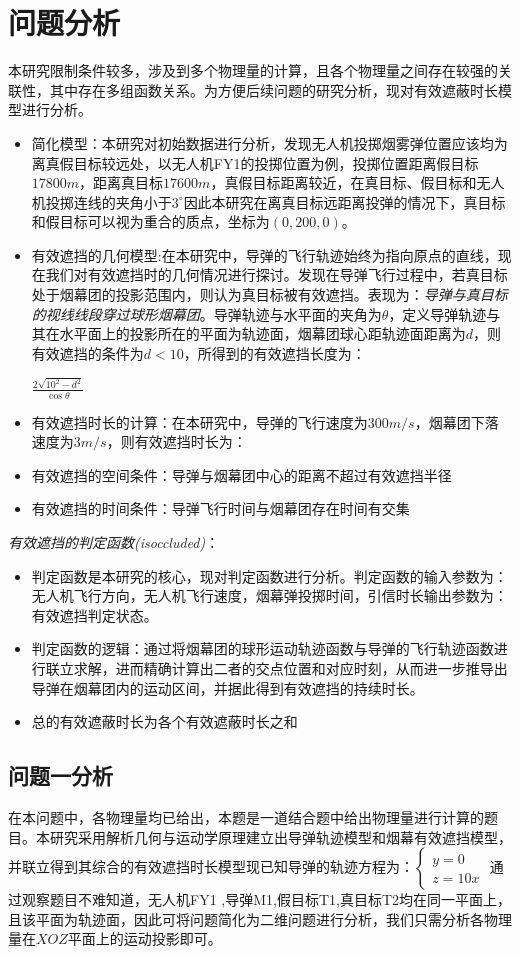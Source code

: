 \documentclass{article}
\begin{document}
\section{问题分析}
本研究限制条件较多，涉及到多个物理量的计算，且各个物理量之间存在较强的关联性，其中存在多组函数关系。为方便后续问题的研究分析，现对有效遮蔽时长模型进行分析。

\begin{itemize}
    \item 简化模型：本研究对初始数据进行分析，发现无人机投掷烟雾弹位置应该均为离真假目标较远处，以无人机FY1的投掷位置为例，投掷位置距离假目标$17800m$，距离真目标$17600m$，真假目标距离较近，在真目标、假目标和无人机投掷连线的夹角小于$3^\circ$因此本研究在离真目标远距离投弹的情况下，真目标和假目标可以视为重合的质点，坐标为$(0,200,0)$。
    \item 有效遮挡的几何模型:在本研究中，导弹的飞行轨迹始终为指向原点的直线，现在我们对有效遮挡时的几何情况进行探讨。发现在导弹飞行过程中，若真目标处于烟幕团的投影范围内，则认为真目标被有效遮挡。表现为：\textit{导弹与真目标的视线线段穿过球形烟幕团}。导弹轨迹与水平面的夹角为$\theta$，定义导弹轨迹与其在水平面上的投影所在的平面为轨迹面，烟幕团球心距轨迹面距离为$d$，则有效遮挡的条件为$d<10$，所得到的有效遮挡长度为：
    \begin{center}
        $\displaystyle \frac{2\sqrt{10^2-d^2}}{\cos\theta}$
    \end{center}
    \item 有效遮挡时长的计算：在本研究中，导弹的飞行速度为$300m/s$，烟幕团下落速度为$3m/s$，则有效遮挡时长为：
    \item 有效遮挡的空间条件：导弹与烟幕团中心的距离不超过有效遮挡半径
    \item 有效遮挡的时间条件：导弹飞行时间与烟幕团存在时间有交集
\end{itemize}

\textit{有效遮挡的判定函数(isoccluded)}：
\begin{itemize}
    \item 判定函数是本研究的核心，现对判定函数进行分析。判定函数的输入参数为：无人机飞行方向，无人机飞行速度，烟幕弹投掷时间，引信时长输出参数为：有效遮挡判定状态。
    \item 判定函数的逻辑：通过将烟幕团的球形运动轨迹函数与导弹的飞行轨迹函数进行联立求解，进而精确计算出二者的交点位置和对应时刻，从而进一步推导出导弹在烟幕团内的运动区间，并据此得到有效遮挡的持续时长。
    \item 总的有效遮蔽时长为各个有效遮蔽时长之和
\end{itemize}
\subsection{问题一分析}
在本问题中，各物理量均已给出，本题是一道结合题中给出物理量进行计算的题目。本研究采用解析几何与运动学原理建立出导弹轨迹模型和烟幕有效遮挡模型，并联立得到其综合的有效遮挡时长模型现已知导弹的轨迹方程为：$\begin{cases}
    y = 0 \\
    z = 10x
\end{cases}$
通过观察题目不难知道，无人机FY1 ,导弹M1,假目标T1,真目标T2均在同一平面上，且该平面为轨迹面，因此可将问题简化为二维问题进行分析，我们只需分析各物理量在$XOZ$平面上的运动投影即可。
\end{document}
